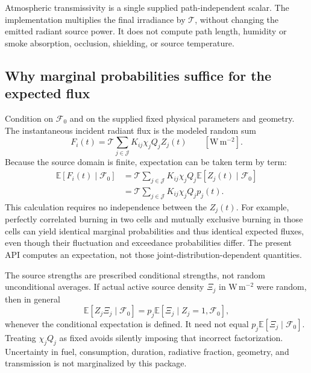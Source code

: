 \documentclass[11pt,a4paper]{article}
\newcommand{\E}{\mathbb{E}}
\begin{document}
Atmospheric transmissivity is a single supplied path-independent scalar.
The implementation multiplies the final irradiance by $\mathcal T$, without
changing the emitted radiant source power. It does not compute path length,
humidity or smoke absorption, occlusion, shielding, or source temperature.

\subsection{Why marginal probabilities suffice for the expected flux}
\label{sec:heat-expectation}

Condition on $\mathcal F_0$ and on the supplied fixed physical parameters and
geometry. The instantaneous incident radiant flux is the modeled random sum
\begin{equation}
 F_i(t)=\mathcal T\sum_{j\in\mathcal J}K_{ij}\chi_jQ_jZ_j(t)
 \qquad[\mathrm{W\,m^{-2}}].
\end{equation}
Because the source domain is finite, expectation can be taken term by term:
\begin{align}
 \E[F_i(t)\mid\mathcal F_0]
 &=\mathcal T\sum_{j\in\mathcal J}K_{ij}\chi_jQ_j
       \E[Z_j(t)\mid\mathcal F_0]\\
 &=\boxed{\mathcal T\sum_{j\in\mathcal J}K_{ij}\chi_jQ_jp_j(t)}.
 \label{eq:heat-linear-expectation}
\end{align}
This calculation requires no independence between the $Z_j(t)$. For
example, perfectly correlated burning in two cells and mutually exclusive
burning in those cells can yield identical marginal probabilities and thus
identical expected fluxes, even though their fluctuation and exceedance
probabilities differ. The present API computes an expectation, not those
joint-distribution-dependent quantities.

The source strengths are prescribed conditional strengths, not random
unconditional averages. If actual active source density $\Xi_j$ in $\mathrm{W\,m^{-2}}$ were random,
then in general
\begin{equation}
 \E[Z_j \Xi_j\mid\mathcal F_0]
 =p_j\E[\Xi_j\mid Z_j=1,\mathcal F_0],
\end{equation}
whenever the conditional expectation is defined. It need not equal
$p_j\E[\Xi_j\mid\mathcal F_0]$. Treating $\chi_jQ_j$ as fixed avoids
silently imposing that incorrect factorization. Uncertainty in fuel,
consumption, duration, radiative fraction, geometry, and transmission is not
marginalized by this package.
\end{document}
